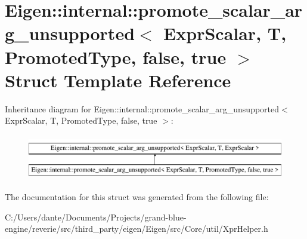\hypertarget{struct_eigen_1_1internal_1_1promote__scalar__arg__unsupported_3_01_expr_scalar_00_01_t_00_01_prob0c1a954168835d1f7a6330930c12504}{}\section{Eigen\+::internal\+::promote\+\_\+scalar\+\_\+arg\+\_\+unsupported$<$ Expr\+Scalar, T, Promoted\+Type, false, true $>$ Struct Template Reference}
\label{struct_eigen_1_1internal_1_1promote__scalar__arg__unsupported_3_01_expr_scalar_00_01_t_00_01_prob0c1a954168835d1f7a6330930c12504}
Inheritance diagram for Eigen\+::internal\+::promote\+\_\+scalar\+\_\+arg\+\_\+unsupported$<$ Expr\+Scalar, T, Promoted\+Type, false, true $>$\+:\begin{figure}[H]
\begin{center}
\leavevmode
\includegraphics[height=2.000000cm]{struct_eigen_1_1internal_1_1promote__scalar__arg__unsupported_3_01_expr_scalar_00_01_t_00_01_prob0c1a954168835d1f7a6330930c12504}
\end{center}
\end{figure}


The documentation for this struct was generated from the following file\+:\begin{DoxyCompactItemize}
\item 
C\+:/\+Users/dante/\+Documents/\+Projects/grand-\/blue-\/engine/reverie/src/third\+\_\+party/eigen/\+Eigen/src/\+Core/util/Xpr\+Helper.\+h\end{DoxyCompactItemize}
